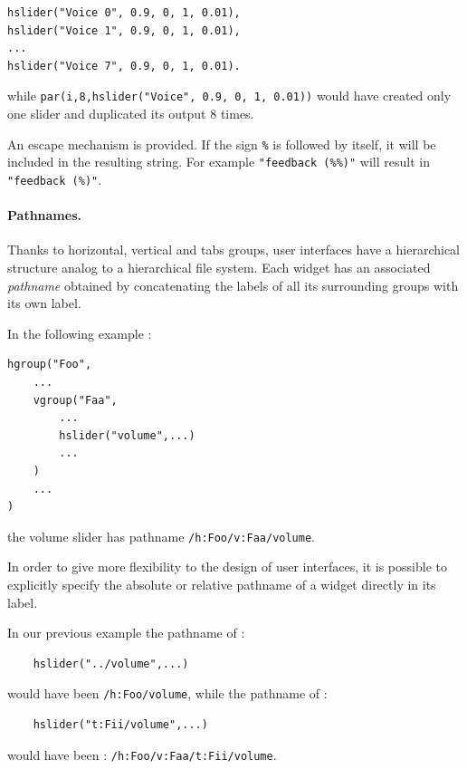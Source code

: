 \documentclass[a4paper,10pt]{book}
\begin{document}
\begin{lstlisting}
hslider("Voice 0", 0.9, 0, 1, 0.01),
hslider("Voice 1", 0.9, 0, 1, 0.01),
...
hslider("Voice 7", 0.9, 0, 1, 0.01).
\end{lstlisting}

while \lstinline'par(i,8,hslider("Voice", 0.9, 0, 1, 0.01))' would have created only one slider and duplicated its output 8 times.


An escape mechanism is provided.
If the sign \lstinline'%' is followed by itself, it will be included in the resulting string.
For example \lstinline'"feedback (%%)"' will result in \lstinline'"feedback (%)"'.

\paragraph{Pathnames.}
Thanks to horizontal, vertical and tabs groups, user interfaces have a hierarchical structure analog to a hierarchical file system. Each widget has an associated \textit{pathname} obtained by concatenating the labels of all its surrounding groups with its own label.

In the following example :
\begin{lstlisting}
hgroup("Foo",
	...
	vgroup("Faa", 
		...
		hslider("volume",...)
		...
	)
	...
)
\end{lstlisting}
the volume slider has pathname \lstinline'/h:Foo/v:Faa/volume'.

In order to give more flexibility to the design of user interfaces, it is possible to explicitly specify the absolute or relative pathname of a widget directly in its label. 

In our previous example the pathname of :
\begin{lstlisting}
	hslider("../volume",...)
\end{lstlisting}
would have been \lstinline'/h:Foo/volume', while the pathname of :
\begin{lstlisting}
	hslider("t:Fii/volume",...)
\end{lstlisting}
would have been : 
\lstinline'/h:Foo/v:Faa/t:Fii/volume'.
\end{document}
